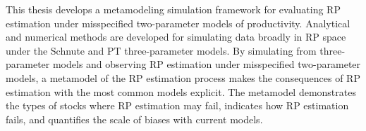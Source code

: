 \documentclass[12pt]{ucscthesis}
\begin{document}
%
This thesis develops a metamodeling simulation framework for evaluating RP 
estimation under misspecified two-parameter models of productivity. Analytical 
and numerical methods are developed for simulating data broadly in RP space 
under the Schnute and PT three-parameter models. 
By simulating from three-parameter models and observing RP estimation under misspecified two-parameter  
models, a metamodel of the RP estimation process makes the consequences of RP estimation with the most 
common models explicit. The metamodel demonstrates the types of stocks where RP estimation may fail, 
indicates how RP estimation fails, and quantifies the scale of biases with current models. 
\end{document}
